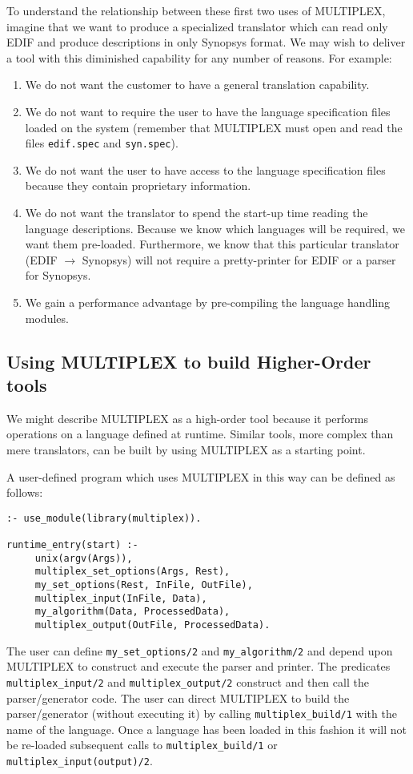 To understand the relationship between these first two
uses of MULTIPLEX, imagine that we want to produce a specialized
translator which can read only EDIF and produce descriptions
in only Synopsys format. We may wish to deliver a tool with this
diminished capability for any number of reasons. For example:
\begin{enumerate}
\item{}
We do not want the customer to have a general translation capability.
\item{}
We do not want to require the user to have the language specification
files loaded on the system (remember that MULTIPLEX must open
and read the files {\tt edif.spec} and {\tt syn.spec}).
\item{}
We do not want the user to have access to the language specification
files because they contain proprietary information.
\item{}
We do not want the translator to spend the start-up time reading
the language descriptions. Because we know which languages
will be required, we want them pre-loaded. Furthermore, we
know that this particular translator (EDIF $\rightarrow$ Synopsys) will
not require a pretty-printer for EDIF or a parser for Synopsys.
\item{}
We gain a performance advantage by pre-compiling the
language handling modules.
\end{enumerate}

\subsection{Using MULTIPLEX to build Higher-Order tools}

We might describe MULTIPLEX as a high-order tool because
it performs operations on a language defined at runtime.
Similar tools, more complex than mere translators,
can be built by using MULTIPLEX as a starting point.

A user-defined program which uses MULTIPLEX in this way
can be defined as follows:
\begin{verbatim}
:- use_module(library(multiplex)).

runtime_entry(start) :-
     unix(argv(Args)),
     multiplex_set_options(Args, Rest),
     my_set_options(Rest, InFile, OutFile),
     multiplex_input(InFile, Data),
     my_algorithm(Data, ProcessedData),
     multiplex_output(OutFile, ProcessedData).
\end{verbatim}
The user can define {\tt my\_set\_options/2} and {\tt my\_algorithm/2}
and depend upon MULTIPLEX to construct and execute the
parser and printer. The predicates {\tt multiplex\_input/2}
and {\tt multiplex\_output/2} construct and then call
the parser/generator code. The user can direct MULTIPLEX
to build the parser/generator (without executing it)
by calling {\tt multiplex\_build/1} with the name of the
language. Once a language has been loaded in this fashion
it will not be re-loaded subsequent calls to {\tt multiplex\_build/1}
or {\tt multiplex\_input(output)/2}.

